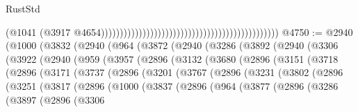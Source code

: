 \begin{lexlean}{RustStd}
\begin{coremodule}
                                                                                              (@1041
                                                                                                (@3917
                                                                                                  @4654)))))))))))))))))))))))))))))))))))))))))))))))
@4750 := @2940
    (@1000
      (@3832
        (@2940
          (@964
            (@3872
              (@2940
                (@3286
                  (@3892
                    (@2940
                      (@3306
                        (@3922
                          (@2940
                            (@959
                              (@3957
                                (@2896
                                  (@3132
                                    (@3680
                                      (@2896
                                        (@3151
                                          (@3718
                                            (@2896
                                              (@3171
                                                (@3737
                                                  (@2896
                                                    (@3201
                                                      (@3767
                                                        (@2896
                                                          (@3231
                                                            (@3802
                                                              (@2896
                                                                (@3251
                                                                  (@3817
                                                                    (@2896
                                                                      (@1000
                                                                        (@3837
                                                                          (@2896
                                                                            (@964
                                                                              (@3877
                                                                                (@2896
                                                                                  (@3286
                                                                                    (@3897
                                                                                      (@2896
                                                                                        (@3306

\end{coremodule}
\end{lexlean}
